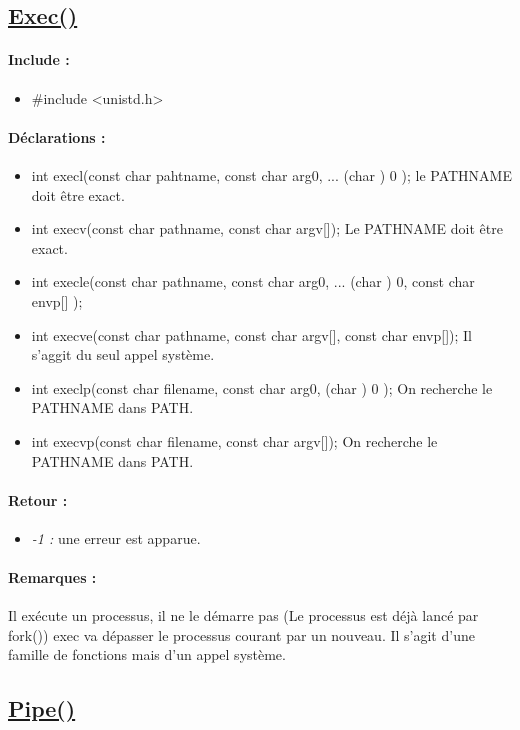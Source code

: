 \documentclass{article}[12pt]
\begin{document}
\subsection{\href{http://jp.barralis.com/linux-man/man3/exec.3.php}{Exec()}}
\paragraph{Include : }
\begin{itemize}
	\item \#include <unistd.h>
\end{itemize}
\paragraph{Déclarations : }
\begin{itemize}
	\item int execl(const char \* pahtname, const char \* arg0, ... \/\* (char \*) 0 \*\/ ); le PATHNAME doit être exact.
    \item int execv(const char \* pathname, const char \* argv[]); Le PATHNAME doit être exact. 
    \item int execle(const char \* pathname, const char \* arg0, ... \/\* (char \*) 0, const char \* envp[] \*\/);
    \item int execve(const char \* pathname, const char \* argv[], const char \* envp[]); Il s'aggit du seul appel système.
    \item int execlp(const char \* filename, const char \* arg0, \/\* (char \*) 0 \*\/); On recherche le PATHNAME dans PATH.
    \item int execvp(const char \* filename, const char \* argv[]); On recherche le PATHNAME dans PATH.
\end{itemize}
\paragraph{Retour : }
\begin{itemize}
	\item \emph{-1 : } une erreur est apparue.
\end{itemize}
\paragraph{Remarques : }
Il exécute un processus, il ne le démarre pas (Le processus est déjà lancé par fork()) exec va dépasser le processus courant par un nouveau. Il s'agit d'une famille de fonctions mais d'un appel système. 
\subsection{\href{http://jp.barralis.com/linux-man/man2/pipe.2.php}{Pipe()}}
\end{document}
